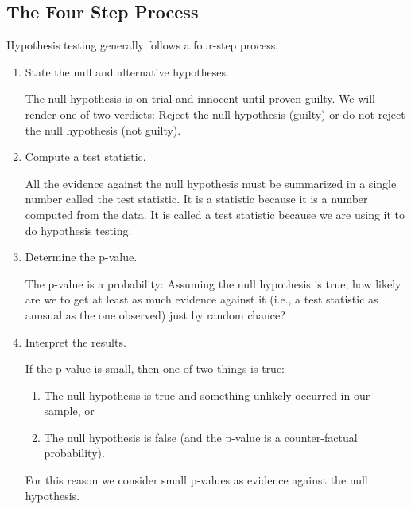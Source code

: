 \documentclass[twoside]{book}
\begin{document}
\subsection{The Four Step Process}
Hypothesis testing generally follows a four-step process.
\begin{enumerate}
	\item 
		State the null and alternative hypotheses.

		The null hypothesis is on trial and innocent until proven guilty.  We will
		render one of two verdicts:  Reject the null hypothesis (guilty) or do not reject
		the null hypothesis (not guilty).  

	\item
		Compute a test statistic.

		All the evidence against the null hypothesis must be summarized in a
		single number called the test statistic.  It is a statistic because 
		it is a number computed from the data.  It is called a test statistic
		because we are using it to do hypothesis testing.

	\item
		Determine the p-value.

		The p-value is a probability:  Assuming the null hypothesis is true,
		how likely are we to get at least as much evidence against it (i.e., a
		test statistic as anusual as the one observed) just by random chance?

	\item
		Interpret the results.

		If the p-value is small, then one of two things is true:
		\begin{enumerate}
			\item The null hypothesis is true and something unlikely occurred
				in our sample, or 
			\item The null hypothesis is false (and the
				p-value is a counter-factual probability).
		\end{enumerate}
		For this reason we consider small p-values as evidence against the null
		hypothesis.
\end{enumerate}
\end{document}
